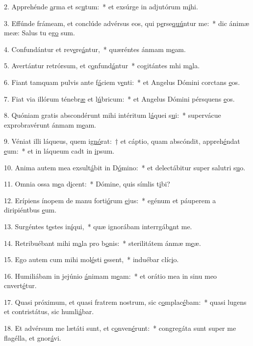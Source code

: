 2. Apprehénde \uline{a}rma et sc\uline{u}tum:~* et exsúrge in adjutórum m\uline{i}hi.\par 
3. Effúnde frámeam, et conclúde advérsus eos, qui p\uline{e}rse\uline{quú}ntur me:~* dic ánimæ meæ: Salus tu eg\uline{o} sum.\par 
4. Confundántur et rev\uline{e}re\uline{á}ntur,~* quæréntes ánmam m\uline{e}am.\par 
5. Avertántur retrórsum, et c\uline{o}nfund\uline{á}ntur~* cogitántes mhi m\uline{a}la.\par 
6. Fiant tamquam pulvis ante f\uline{á}ciem v\uline{e}nti:~* et Angelus Dómini corctans \uline{e}os.\par 
7. Fiat via illórum ténebr\uline{æ} et l\uline{ú}bricum:~* et Angelus Dómini pérsquens \uline{e}os.\par 
8. Quóniam gratis abscondérunt mihi intéritum l\uline{á}quei s\uline{u}i:~* supervácue exprobravérunt ánmam m\uline{e}am.\par 
9. Véniat illi láqueus, quem i\uline{gnó}rat:~† et cáptio, quam abscóndit, appreh\uline{é}ndat \uline{e}um:~* et in láqueum cadt in \uline{i}psum.\par 
10. Anima autem mea exsult\uline{á}bit in D\uline{ó}mino:~* et delectábitur super salutri s\uline{u}o.\par 
11. Omnia ossa m\uline{e}a d\uline{i}cent:~* Dómine, quis símlis t\uline{i}bi?\par 
12. Erípiens ínopem de manu forti\uline{ó}rum \uline{e}jus:~* egénum et páuperem a diripiéntbus \uline{e}um.\par 
13. Surgéntes t\uline{e}stes in\uline{í}qui,~* quæ ignorábam interrgáb\uline{a}nt me.\par 
14. Retribuébant mihi m\uline{a}la pro b\uline{o}nis:~* sterilitátem ánmæ m\uline{e}æ.\par 
15. Ego autem cum mihi mol\uline{é}sti \uline{e}ssent,~* induébar clíc\uline{i}o.\par 
16. Humiliábam in jejúnio \uline{á}nimam m\uline{e}am:~* et orátio mea in sinu meo cnvert\uline{é}tur.\par 
17. Quasi próximum, et quasi fratrem nostrum, sic c\uline{o}mplac\uline{é}bam:~* quasi lugens et contristátus, sic humli\uline{á}bar.\par 
18. Et advérsum me lætáti sunt, et c\uline{o}nven\uline{é}runt:~* congregáta sunt super me flagélla, et gnor\uline{á}vi.\par 
